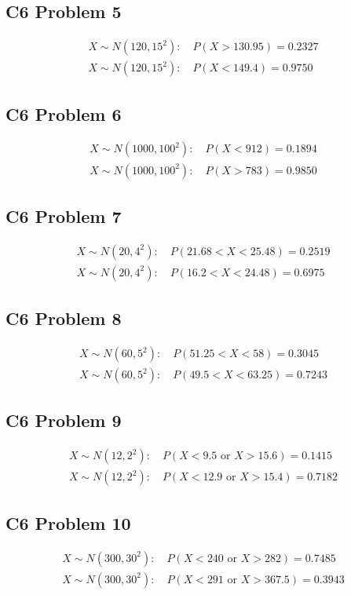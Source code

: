 	\subsection{C6 Problem 5}
	\[
	\begin{array}{l}
	X\sim N(120,15^2):\quad P(X>130.95)=0.2327\\
	X\sim N(120,15^2):\quad P(X<149.4)=0.9750
	\end{array}
	\]

	\subsection{C6 Problem 6}
	\[
	\begin{array}{l}
	X\sim N(1000,100^2):\quad P(X<912)=0.1894\\
	X\sim N(1000,100^2):\quad P(X>783)=0.9850
	\end{array}
	\]

	\subsection{C6 Problem 7}
	\[
	\begin{array}{l}
	X\sim N(20,4^2):\quad P(21.68<X<25.48)=0.2519\\
	X\sim N(20,4^2):\quad P(16.2<X<24.48)=0.6975
	\end{array}
	\]

	\subsection{C6 Problem 8}
	\[
	\begin{array}{l}
	X\sim N(60,5^2):\quad P(51.25<X<58)=0.3045\\
	X\sim N(60,5^2):\quad P(49.5<X<63.25)=0.7243
	\end{array}
	\]

	\subsection{C6 Problem 9}
	\[
	\begin{array}{l}
	X\sim N(12,2^2):\quad P(X<9.5\text{ or }X>15.6)=0.1415\\
	X\sim N(12,2^2):\quad P(X<12.9\text{ or }X>15.4)=0.7182
	\end{array}
	\]

	\subsection{C6 Problem 10}
	\[
	\begin{array}{l}
	X\sim N(300,30^2):\quad P(X<240\text{ or }X>282)=0.7485\\
	X\sim N(300,30^2):\quad P(X<291\text{ or }X>367.5)=0.3943
	\end{array}
	\]

